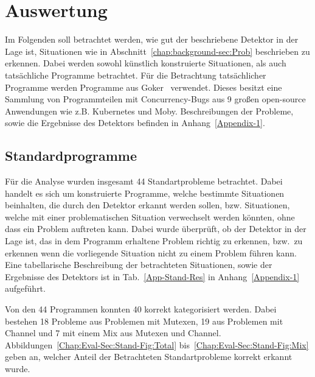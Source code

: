 \chapter{Auswertung}\label{Chap:Eval}
Im Folgenden soll betrachtet werden, wie gut der beschriebene Detektor 
in der Lage ist, Situationen wie in Abschnitt~\ref{chap:background-sec:Prob}
beschrieben zu erkennen. Dabei werden sowohl künstlich konstruierte 
Situationen, als auch tatsächliche Programme betrachtet. Für die Betrachtung 
tatsächlicher Programme werden Programme aus Goker~\cite{gobench}
verwendet. Dieses besitzt eine Sammlung von Programmteilen mit 
Concurrency-Bugs aus 9 
großen open-source Anwendungen wie z.B. Kubernetes und Moby. 
Beschreibungen der Probleme, sowie die Ergebnisse des Detektors befinden in 
Anhang~\ref{Appendix-1}.

\section{Standardprogramme}
Für die Analyse wurden insgesamt 44 Standartprobleme betrachtet. 
Dabei handelt es sich um konstruierte Programme, welche bestimmte 
Situationen beinhalten, die durch den Detektor erkannt werden sollen, 
bzw. Situationen, welche mit einer problematischen Situation verwechselt 
werden könnten, ohne dass ein Problem auftreten kann.  
Dabei wurde überprüft, ob der Detektor in der Lage ist, das in dem 
Programm erhaltene Problem richtig zu erkennen, bzw.~zu erkennen wenn 
die vorliegende Situation nicht zu einem Problem führen kann. Eine 
tabellarische Beschreibung der betrachteten Situationen, sowie der Ergebnisse 
des Detektors ist in Tab.~\ref{App-Stand-Res} in Anhang~\ref{Appendix-1} aufgeführt.

Von den 44 Programmen konnten 40 korrekt kategorisiert werden. Dabei 
bestehen 18 Probleme aus Problemen mit Mutexen,
19 aus Problemen mit Channel und 7 mit einem 
Mix aus Mutexen und Channel. Abbildungen~\ref{Chap:Eval-Sec:Stand-Fig:Total}
bis~\ref{Chap:Eval-Sec:Stand-Fig:Mix} geben an, welcher Anteil der 
Betrachteten Standartprobleme korrekt erkannt wurde.

